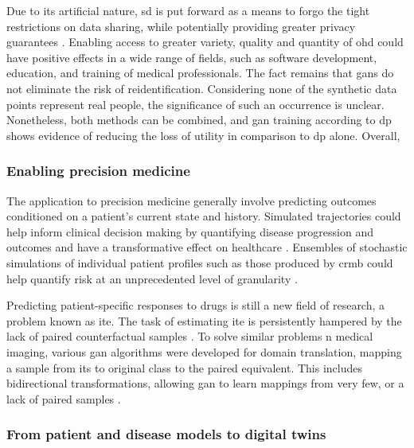             Due to its artificial nature, \gls{sd} is put forward as a means to forgo the tight restrictions on data sharing, while potentially providing greater privacy guarantees \cite{Beaulieu-Jones2019-ct, baowaly_2019_IEEE, baowaly_2019_jamia,esteban2017real,Fisher2019,walsh2020generating, chin2019generation}. Enabling access to greater variety, quality and quantity of \gls{ohd} could have positive effects in a wide range of fields, such as software development, education, and training of medical professionals. The fact remains that \glspl{gan} do not eliminate the risk of reidentification. Considering none of the synthetic data points represent real people, the significance of such an occurrence is unclear.  Nonetheless, both methods can be combined, and \gls{gan} training according to \gls{dp} shows evidence of reducing the loss of utility in comparison to \gls{dp} alone.  Overall,  
    
        \subsubsection{Enabling precision medicine}\label{sec:precision_med}
    
            The application to precision medicine generally involve predicting outcomes conditioned on a patient's current state and history. Simulated trajectories could help inform clinical decision making by quantifying disease progression and outcomes and have a transformative effect on healthcare \cite{walsh2020generating, Fisher2019}. Ensembles of stochastic simulations of individual patient profiles such as those produced by \gls{crmb} could help quantify risk at an unprecedented level of granularity \cite{Fisher2019}.\par
            Predicting patient-specific responses to drugs is still a new field of research, a problem known as \gls{ite}. The task of estimating \gls{ite} is persistently hampered by the lack of paired counterfactual samples \cite{Yoon2018-ite, chu2019treatment}. To solve similar problems n medical imaging, various \gls{gan} algorithms were developed for domain translation, mapping a sample from its to original class to the paired equivalent. This includes bidirectional transformations, allowing \gls{gan} to learn mappings from very few, or a lack of paired samples \cite{Wolterink2017DeepMT, CycleGAN2017, mcdermott2018semi}.
    
        \subsubsection{From patient and disease models to digital twins}\label{sec:models_twins}
    
